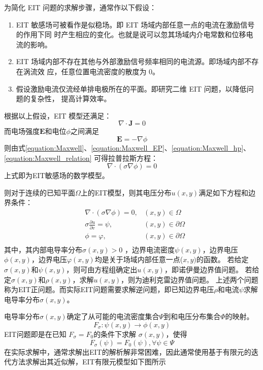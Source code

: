为简化 EIT 问题的求解步骤，通常作以下假设：
\begin{enumerate}
  \item EIT 敏感场可被看作是似稳场。即 EIT 场域内部任意一点的电流在激励信号的作用下同
  时产生相应的变化。也就是说可以忽其场域内介电常数和位移电流的影响。
  \item EIT 场域内部不存在其他与外部激励信号频率相同的电流源。即场域内部不存在涡流效
  应，任意位置电流密度的散度为 0。
  \item 假设激励电流仅流经单排电极所在的平面。即研究二维 EIT 问题，以降低问题的复杂性，
  提高计算效率。
\end{enumerate}
根据以上假设，EIT 模型还满足：
\begin{equation}
  \label{equation:Maxwell_hp}
  \nabla \cdot \boldsymbol{J} = 0
\end{equation}
而电场强度$\boldsymbol{E}$和电位$\phi$之间满足
\begin{equation}
  \label{equation:Maxwell_EP}
  \boldsymbol{E} = - \nabla \phi
\end{equation}
则由式\cref{equation:Maxwell}、\cref{equation:Maxwell_EP}、\cref{equation:Maxwell_hp}、\cref{equation:Maxwell_relation}
可得拉普拉斯方程：
\begin{equation}
  \nabla \cdot (\sigma\nabla\phi) = 0
\end{equation}
上式即为EIT敏感场的数学模型。

则对于连续的已知平面$\Omega$上的EIT模型，则其电压分布$u(x,y)$满足如下方程和边界条件：
\begin{equation}
  \begin{aligned}
  &\nabla \cdot (\sigma \nabla \phi) = 0, &(x, y)\in {\Omega} \\
  &\sigma\frac{\partial{u}}{\partial{v}} = \psi, &(x,y) \in {\partial{\Omega}} \\
  &\phi = \varphi, &(x,y)\in\partial{\Omega} \\
\end{aligned}
\end{equation}
其中，其内部电导率分布$\sigma(x,y) > 0$ ，边界电流密度$\psi(x,y)$，边界电压$\phi(x,y)$，边界电压$\varphi(x,y)$均是关于场域内部任意一点($x,y)$的函数。
若给定$\sigma(x,y)$和$\psi(x,y)$，则可由方程组确定出$u(x,y)$，即诺伊曼边界值问题。
若给定$\sigma(x,y)$和$\rho(x,y)$，求解$u(x,y)$，则为迪利克雷边界值问题。
上述两个问题称为EIT正问题。而实际EIT问题需要求解逆问题，即已知边界电压$\rho$和电流$\psi$求解电导率分布$\sigma(x,y)$。

电导率分布$\sigma(x,y)$确定了从可能的电流密度集合$\Psi$到和电压分布集合$\Phi$的映射。
\begin{equation}
  F_\sigma: \psi(x,y) \rightarrow \phi(x,y)
\end{equation}
EIT问题即是在已知 $F_{\sigma} = F_0$的条件下求解 $\sigma(x,y)$，使得
\begin{equation}
  F_{\sigma}(\psi) = F_{0}(\psi),  \forall \psi \in \Psi
\end{equation}
在实际求解中，通常求解出EIT的解析解非常困难，因此通常使用基于有限元的迭代方法求解出其近似解，EIT有限元模型如下图所示

